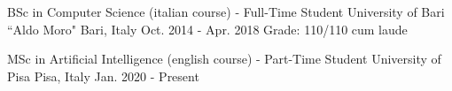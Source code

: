 

\begin{cventries}

  \cventry
    {BSc in Computer Science (italian course) - Full-Time Student} %
    {University of Bari ``Aldo Moro"} %
    {Bari, Italy} %
    {Oct. 2014 - Apr. 2018} %
    {Grade: 110/110 cum laude}
    
  \cventry
    {MSc in Artificial Intelligence (english course) - Part-Time Student} %
    {University of Pisa} %
    {Pisa, Italy} %
    {Jan. 2020 - Present} %
    {}

\end{cventries}
